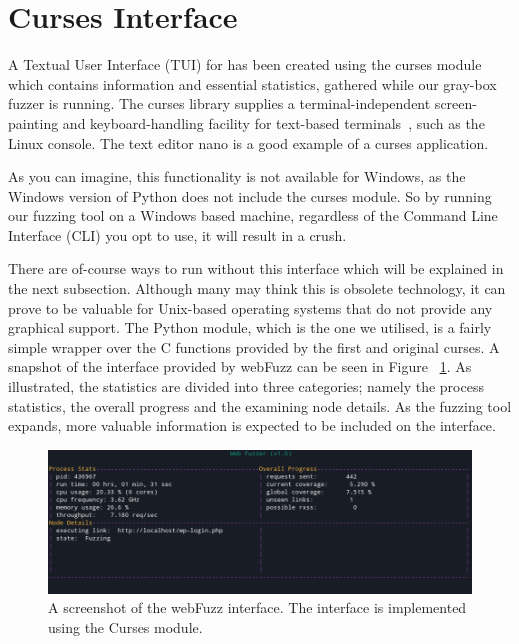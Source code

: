 \section{Curses Interface}
A Textual User Interface (TUI) for \pname{} has been created using the curses module which contains information and essential statistics, gathered while our gray-box fuzzer is running. The curses library supplies a terminal-independent screen-painting and keyboard-handling facility for text-based terminals~\cite{curses}, such as the Linux console. The text editor nano is a good example of a curses application. 

As you can imagine, this functionality is not available for Windows, as the Windows version of Python does not include the curses module. So by running our fuzzing tool on a Windows based machine, regardless of the Command Line Interface (CLI) you opt to use, it will result in a crush. 

There are of-course ways to run \pname{} without this interface which will be explained in the next subsection. Although many may think this is obsolete technology, it can prove to be  valuable for Unix-based operating systems that do not provide any graphical support. The Python module, which is the one we utilised, is a fairly simple wrapper over the C functions provided by the first and original curses. A snapshot of the interface provided by webFuzz can be seen in Figure ~\ref{fig:curses_interface}. As illustrated, the statistics are divided into three categories; namely the process statistics, the overall progress and the examining node details.
As the fuzzing tool expands, more valuable information is expected to be included on the interface.

\begin{figure}[ht]
 \centering
 \captionsetup{justification=centering}
 \includegraphics[width=\linewidth]{figures/curses.png}
 \caption{A screenshot of the webFuzz interface. The interface is implemented using the Curses module.}
 \label{fig:curses_interface}
\end{figure}

